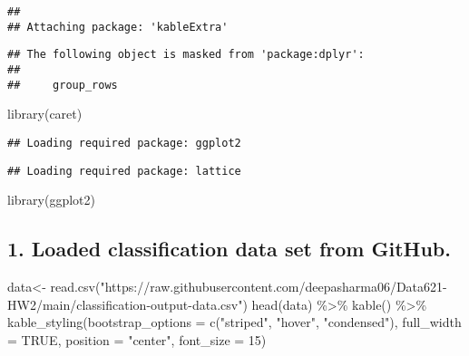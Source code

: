 \documentclass[
]{article}
\newenvironment{Shaded}{\begin{snugshade}}{\end{snugshade}}
\newcommand{\AttributeTok}[1]{\textcolor[rgb]{0.77,0.63,0.00}{#1}}
\newcommand{\ConstantTok}[1]{\textcolor[rgb]{0.00,0.00,0.00}{#1}}
\newcommand{\DecValTok}[1]{\textcolor[rgb]{0.00,0.00,0.81}{#1}}
\newcommand{\FunctionTok}[1]{\textcolor[rgb]{0.00,0.00,0.00}{#1}}
\newcommand{\NormalTok}[1]{#1}
\newcommand{\OtherTok}[1]{\textcolor[rgb]{0.56,0.35,0.01}{#1}}
\newcommand{\SpecialCharTok}[1]{\textcolor[rgb]{0.00,0.00,0.00}{#1}}
\newcommand{\StringTok}[1]{\textcolor[rgb]{0.31,0.60,0.02}{#1}}
\begin{document}
\begin{verbatim}
## 
## Attaching package: 'kableExtra'
\end{verbatim}

\begin{verbatim}
## The following object is masked from 'package:dplyr':
## 
##     group_rows
\end{verbatim}

\begin{Shaded}
\begin{Highlighting}[]
\FunctionTok{library}\NormalTok{(caret)}
\end{Highlighting}
\end{Shaded}

\begin{verbatim}
## Loading required package: ggplot2
\end{verbatim}

\begin{verbatim}
## Loading required package: lattice
\end{verbatim}

\begin{Shaded}
\begin{Highlighting}[]
\FunctionTok{library}\NormalTok{(ggplot2)}
\end{Highlighting}
\end{Shaded}

\hypertarget{loaded-classification-data-set-from-github.}{%
\subsection{1. Loaded classification data set from
GitHub.}\label{loaded-classification-data-set-from-github.}}

\begin{Shaded}
\begin{Highlighting}[]
\NormalTok{data}\OtherTok{\textless{}{-}} \FunctionTok{read.csv}\NormalTok{(}\StringTok{"https://raw.githubusercontent.com/deepasharma06/Data621{-}HW2/main/classification{-}output{-}data.csv"}\NormalTok{)}
\FunctionTok{head}\NormalTok{(data) }\SpecialCharTok{\%\textgreater{}\%} \FunctionTok{kable}\NormalTok{() }\SpecialCharTok{\%\textgreater{}\%} \FunctionTok{kable\_styling}\NormalTok{(}\AttributeTok{bootstrap\_options =} \FunctionTok{c}\NormalTok{(}\StringTok{"striped"}\NormalTok{, }\StringTok{"hover"}\NormalTok{, }\StringTok{"condensed"}\NormalTok{), }\AttributeTok{full\_width =} \ConstantTok{TRUE}\NormalTok{, }\AttributeTok{position =} \StringTok{"center"}\NormalTok{, }\AttributeTok{font\_size =} \DecValTok{15}\NormalTok{)}
\end{Highlighting}
\end{Shaded}
\end{document}
